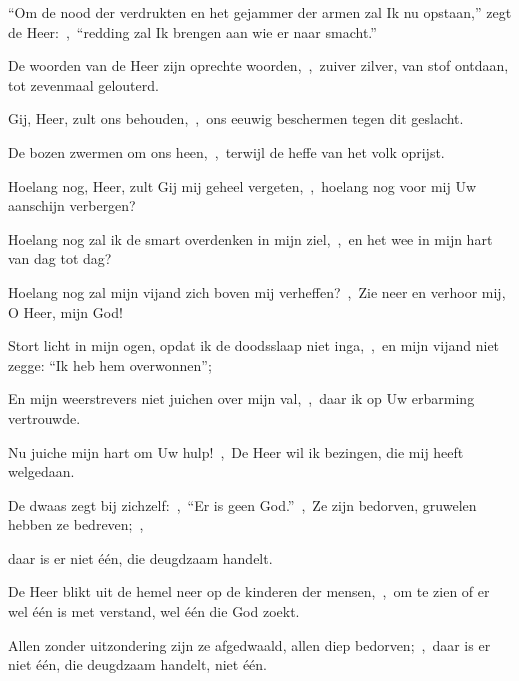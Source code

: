 \documentclass[12pt,twoside,a5paper]{article}
\begin{document}

\begin{halfparskip}
  ``Om de nood der verdrukten en het gejammer der armen zal Ik nu opstaan,'' zegt de Heer:~\sep\ ``redding zal Ik brengen aan wie er naar smacht.''

  De woorden van de Heer zijn oprechte woorden,~\sep\ zuiver zilver, van stof ontdaan, tot zevenmaal gelouterd.

  Gij, Heer, zult ons behouden,~\sep\ ons eeuwig beschermen tegen dit geslacht.

  De bozen zwermen om ons heen,~\sep\ terwijl de heffe van het volk oprijst.
\end{halfparskip}



\begin{halfparskip}
  Hoelang nog, Heer, zult Gij mij geheel vergeten,~\sep\ hoelang nog voor mij Uw aanschijn verbergen?


  Hoelang nog zal ik de smart overdenken in mijn ziel,~\sep\ en het wee in mijn hart van dag tot dag?

  Hoelang nog zal mijn vijand zich boven mij verheffen?~\sep\ Zie neer en verhoor mij, O Heer, mijn God!
\end{halfparskip}


\begin{halfparskip}
  Stort licht in mijn ogen, opdat ik de doodsslaap niet inga,~\sep\ en mijn vijand niet zegge: ``Ik heb hem overwonnen'';

  En mijn weerstrevers niet juichen over mijn val,~\sep\ daar ik op Uw erbarming vertrouwde.

  Nu juiche mijn hart om Uw hulp!~\sep\ De Heer wil ik bezingen, die mij heeft welgedaan.
\end{halfparskip}



\begin{halfparskip}
  De dwaas zegt bij zichzelf:~\sep\ ``Er is geen God.''~\sep\ Ze zijn bedorven, gruwelen hebben ze bedreven;~\sep


  daar is er niet één, die deugdzaam handelt.

  De Heer blikt uit de hemel neer op de kinderen der mensen,~\sep\ om te zien of er wel één is met verstand, wel één die God zoekt.

  Allen zonder uitzondering zijn ze afgedwaald, allen diep bedorven;~\sep\ daar is er niet één, die deugdzaam handelt, niet één.
\end{halfparskip}
\end{document}
